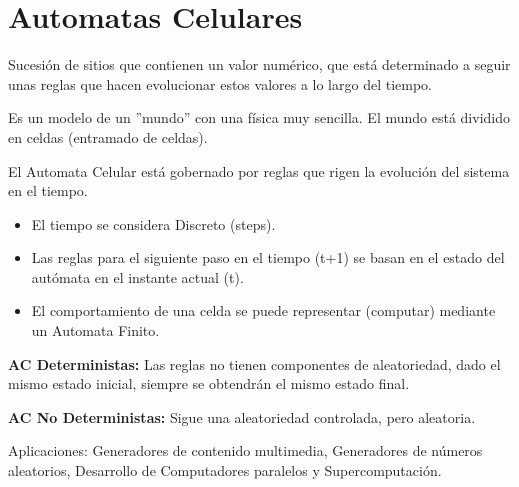 \section{Automatas Celulares}
Sucesión de sitios que contienen un valor numérico, que está determinado a seguir unas reglas que hacen evolucionar estos valores a lo largo del tiempo.

Es un modelo de un ''mundo'' con una física muy sencilla. El mundo está dividido en celdas (entramado de celdas).

El Automata Celular está gobernado por reglas que rigen la evolución del sistema en el tiempo.
\begin{itemize}
    \item El tiempo se considera Discreto (steps).
    \item Las reglas para el siguiente paso en el tiempo (t+1) se basan en el estado del autómata en el instante actual (t).
    \item El comportamiento de una celda se puede representar (computar) mediante un Automata Finito.
\end{itemize}

\textbf{AC Deterministas:} Las reglas no tienen componentes de aleatoriedad, dado el mismo estado inicial, siempre se obtendrán el mismo estado final.

\textbf{AC No Deterministas:} Sigue una aleatoriedad controlada, pero aleatoria.

Aplicaciones: Generadores de contenido multimedia, Generadores de números aleatorios, Desarrollo de Computadores paralelos y Supercomputación.

